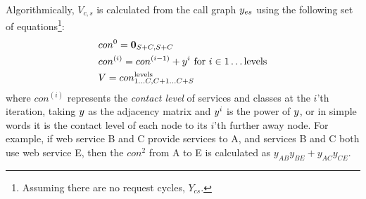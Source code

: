  Algorithmically, $V_{c,s}$ is calculated from the call graph $y_{es}$ using the following set of equations\footnote{Assuming there are no request cycles, $Y_{cs}$.}:  
%
\begin{align} 
& con^0=\mathbf{0}_{S+C, S+ C} \label{eq: compute-adjacency-matrix}  \\
& con^{(i)}= con^{(i-1)}+ y^i  \text{ for } i \in 1\ldots \text{levels}   \nonumber \\ 
&V=con^\text{levels}_{1\ldots C, C+1\ldots C+S} \nonumber 
\end{align}  
where  $con^{(i)}$ represents the \textit{contact level} of services and classes at the $i$'th iteration, taking $y$ as the adjacency matrix and $y^i$ is the power of $y$, or in simple words it is the contact level of each node to its $i$'th further away node.  
For example, if web service B and C provide services to A, and services B and C both use web service E, then the $con^2$ from A to E  is calculated as $y_{AB}y_{BE}+y_{AC}y_{CE}$.  

     
